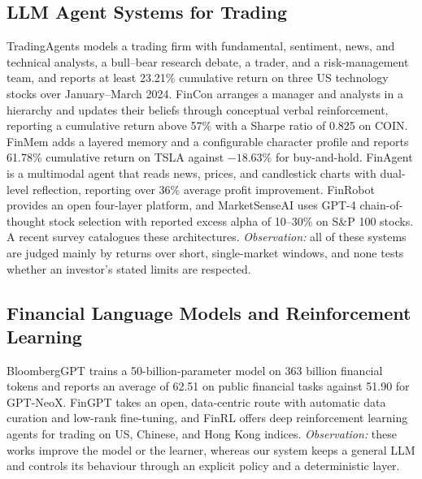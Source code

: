 \subsection{LLM Agent Systems for Trading}
TradingAgents \cite{tradingagents} models a trading firm with fundamental, sentiment, news, and technical analysts, a bull--bear research debate, a trader, and a risk-management team, and reports at least 23.21\% cumulative return on three US technology stocks over January--March 2024. FinCon \cite{fincon} arranges a manager and analysts in a hierarchy and updates their beliefs through conceptual verbal reinforcement, reporting a cumulative return above 57\% with a Sharpe ratio of 0.825 on COIN. FinMem \cite{finmem} adds a layered memory and a configurable character profile and reports 61.78\% cumulative return on TSLA against $-18.63\%$ for buy-and-hold. FinAgent \cite{finagent} is a multimodal agent that reads news, prices, and candlestick charts with dual-level reflection, reporting over 36\% average profit improvement. FinRobot \cite{finrobot} provides an open four-layer platform, and MarketSenseAI \cite{marketsenseai} uses GPT-4 chain-of-thought stock selection with reported excess alpha of 10--30\% on S\&P 100 stocks. A recent survey \cite{llmtradingsurvey} catalogues these architectures. \emph{Observation:} all of these systems are judged mainly by returns over short, single-market windows, and none tests whether an investor's stated limits are respected.

\subsection{Financial Language Models and Reinforcement Learning}
BloombergGPT \cite{bloomberggpt} trains a 50-billion-parameter model on 363 billion financial tokens and reports an average of 62.51 on public financial tasks against 51.90 for GPT-NeoX. FinGPT \cite{fingpt} takes an open, data-centric route with automatic data curation and low-rank fine-tuning, and FinRL \cite{finrl} offers deep reinforcement learning agents for trading on US, Chinese, and Hong Kong indices. \emph{Observation:} these works improve the model or the learner, whereas our system keeps a general LLM and controls its behaviour through an explicit policy and a deterministic layer.

